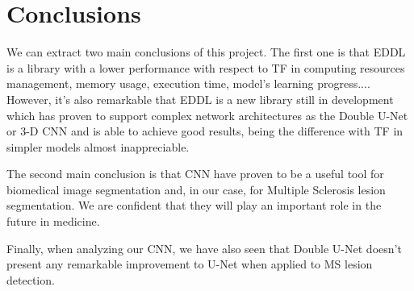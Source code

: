 \chapter{Conclusions}
\label{5.Conclusions}

We can extract two main conclusions of this project. The first one is that EDDL is a library with a lower performance with respect to TF in computing resources management, memory usage, execution time, model's learning progress.... However, it's also remarkable that EDDL is a new library still in development which has proven to support complex network architectures as the Double U-Net or 3-D CNN and is able to achieve good results, being the difference with TF in simpler models almost inappreciable.

The second main conclusion is that CNN have proven to be a useful tool for biomedical image segmentation and, in our case, for Multiple Sclerosis lesion segmentation. We are confident that they will play an important role in the future in medicine. 

Finally, when analyzing our CNN, we have also seen that Double U-Net doesn't present any remarkable improvement to U-Net when applied to MS lesion detection.



